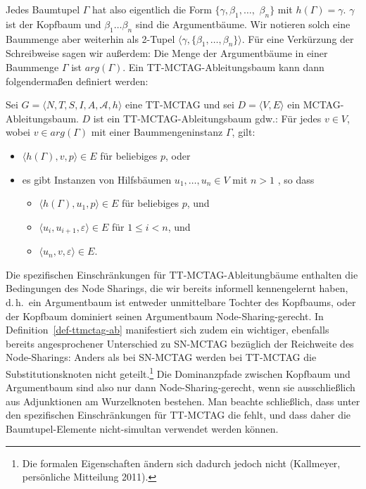 Jedes Baumtupel $\Gamma$ hat also eigentlich die Form $\{ \gamma, \beta_1,\ldots,$ $\beta_n\}$ mit $h(\Gamma) = \gamma$. $\gamma$ ist der Kopfbaum und $\beta_1 \ldots \beta_n$ sind die Argumentbäume. Wir notieren solch eine Baummenge aber weiterhin als 2-Tupel $\langle \gamma, \{\beta_1, \ldots, \beta_n\} \rangle$. Für eine Verkürzung der Schreibweise sagen wir außerdem: Die Menge der Argumentbäume in einer Baummenge $\Gamma$ ist $arg(\Gamma)$. Ein TT-MCTAG-Ableitungsbaum kann dann folgenderma\ss en definiert werden:
\begin{definition}\label{def-ttmctag-ab}
Sei $G = \langle N,T,S,I,A,\mathcal{A},h \rangle$ eine TT-MC\-TAG und sei $D = \langle V,E \rangle$ ein MCTAG-Ableitungsbaum. $D$ ist ein TT-MCTAG-Ablei\-tungs\-baum gdw.:
Für jedes $v \in V$, wobei $v \in arg(\Gamma)$ mit einer Baummengeninstanz $\Gamma$, gilt:
\begin{itemize} 
  \item $\langle h(\Gamma),v,p \rangle \in E$ für beliebiges $p$, oder
  \item es gibt Instanzen von Hilfsbäumen $u_1, \ldots, u_n \in V$ mit $n>1$ , so dass
  \begin{itemize}
    \item $\langle h(\Gamma),u_1,p \rangle \in E$ für beliebiges $p$, und
    \item $\langle u_i,u_{i+1},\varepsilon \rangle \in E$ für $1 \leq i < n$, und
    \item $\langle u_n,v,\varepsilon \rangle \in E$.
  \end{itemize}
\end{itemize}  
\end{definition}
Die spezifischen Einschränkungen für TT-MCTAG-Ableitungbäume enthalten die Bedingungen des Node Sharings, die wir bereits informell kennengelernt haben, d.\,h.\ ein Argumentbaum ist entweder unmittelbare Tochter des Kopfbaums, oder der Kopfbaum dominiert seinen Argumentbaum Node-Sharing-gerecht. In Definition~\ref{def-ttmctag-ab} manifestiert sich zudem ein wichtiger, ebenfalls bereits angesprochener Unterschied zu SN-MCTAG \citep{Kallmeyer:05,Kallmeyer:09} bezüglich der Reichweite des Node-Sharings: Anders als bei SN-MCTAG werden bei TT-MCTAG die Substitutionsknoten nicht geteilt.\footnote{Die formalen Eigenschaften ändern sich dadurch jedoch nicht (Kallmeyer, persönliche Mitteilung 2011).} Die Dominanzpfade zwischen Kopfbaum und Argumentbaum sind also nur dann Node-Sharing-gerecht, wenn sie ausschlie\ss lich aus Adjunktionen am Wurzelknoten bestehen.
Man beachte schlie\ss lich, dass unter den spezifischen Einschränkungen für TT-MCTAG die  fehlt, und dass daher die Baumtupel-Elemente nicht-simultan verwendet werden können.

